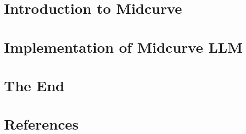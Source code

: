 \section[Midcurve]{Introduction to Midcurve}


% 

% 

\section[LLMIMPL]{Implementation of Midcurve LLM}


\section[End]{The End}


\section[Refs]{References}

